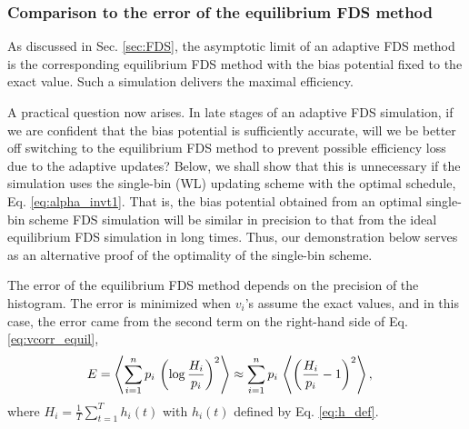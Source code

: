 \documentclass[reprint, floatfix]{revtex4-1}
\begin{document}
\subsubsection{\label{sec:equilerr}
Comparison to the error of the equilibrium FDS method}


As discussed in Sec. \ref{sec:FDS},
the asymptotic limit of an adaptive FDS method
is the corresponding equilibrium FDS method
with the bias potential fixed to the exact value.
%
Such a simulation delivers the maximal efficiency.

A practical question now arises.
%
In late stages of an adaptive FDS simulation,
if we are confident that the bias potential
is sufficiently accurate,
will we be better off switching to the equilibrium FDS method
to prevent possible efficiency loss
due to the adaptive updates?
%
Below, we shall show that this is unnecessary
if the simulation uses the single-bin (WL) updating scheme
with the optimal schedule, Eq. \eqref{eq:alpha_invt1}.
%
That is, the bias potential obtained from
an optimal single-bin scheme FDS simulation
will be similar in precision to that from
the ideal equilibrium FDS simulation
in long times.
%
Thus, our demonstration below serves as an alternative proof
of the optimality of the single-bin scheme.

The error of the equilibrium FDS method
depends on the precision of the histogram.
%
The error is minimized
when $v_i$'s assume the exact values,
%
and in this case,
the error came from the second term
on the right-hand side of Eq. \eqref{eq:vcorr_equil},
%
\begin{align}
  E
  &=
  \left\langle
    \sum_{ i = 1 }^ n
      p_i \,
      \left(
        \log \frac { H_i }
                   { p_i }
      \right)^2
  \right\rangle
  \approx
  \sum_{ i = 1 }^ n
    p_i \,
    \left\langle
      \left(
        \frac { H_i }
              { p_i }
        - 1
      \right)^2
    \right\rangle,
\notag
\end{align}
where
$H_i = \frac{1}{T} \sum_{t = 1}^T h_i(t)$
with
$h_i(t)$ defined by Eq. \eqref{eq:h_def}.
\end{document}
